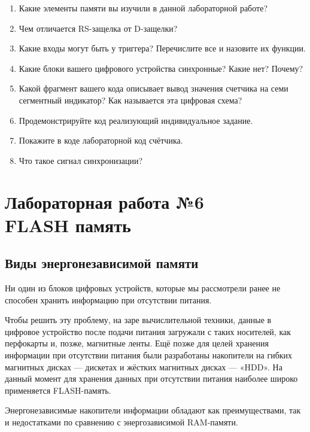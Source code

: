 \documentclass[a5paper, DIV=14, headings=openany, twoside=true,fontsize=10pt, titlepage]{scrreprt}
\newcommand{\quotes}[1]{«#1»}
\newcommand{\eng}[1]{\foreignlanguage{english}{#1}}
\newcommand{\qeng}[1]{\quotes{\eng{#1}}}
\begin{document}
\begin{enumerate}[noitemsep,topsep=0pt, after=\vspace{2pt}]
  \item Какие элементы памяти вы изучили в данной лабораторной работе?
  \item Чем отличается \eng{RS}-защелка от \eng{D}-защелки?
  \item Какие входы могут быть у триггера? Перечислите все и назовите их функции.
  \item Какие блоки вашего цифрового устройства синхронные? Какие нет? Почему?
  \item Какой фрагмент вашего кода описывает вывод значения счетчика на семи сегментный индикатор? Как называется эта цифровая схема?
  \item Продемонстрируйте код реализующий индивидуальное задание.
  \item Покажите в коде лабораторной код счётчика.
  \item Что такое сигнал синхронизации?
\end{enumerate}





\chapter{Лабораторная работа №6\\\eng{FLASH} память} 

\section{Виды энергонезависимой памяти}

\par{Ни один из блоков цифровых устройств, которые мы рассмотрели ранее не способен хранить информацию при отсутствии питания.}

\par{Чтобы решить эту проблему, на заре вычислительной техники, данные в цифровое устройство после подачи питания загружали с таких носителей, как перфокарты и, позже, магнитные ленты. Ещё позже для целей хранения информации при отсутствии питания были разработаны накопители на гибких магнитных дисках --- дискетах и жёстких магнитных дисках --- \qeng{HDD}. На данный момент для хранения данных при отсутствии питания наиболее широко применяется \eng{FLASH}-память.}

\par{Энергонезависимые накопители информации обладают как преимуществами, так и недостатками по сравнению с энергозависимой \eng{RAM}-памяти.} 
\end{document}
